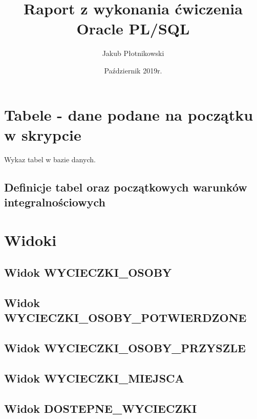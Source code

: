 \documentclass[a4paper, 11pt]{article}
\title{Raport z wykonania ćwiczenia Oracle PL/SQL}
\author{Jakub Płotnikowski}
\date{Październik 2019r.}
\begin{document}
    \maketitle
    \tableofcontents


    \newpage

    \section{Tabele - dane podane na początku w skrypcie}
    \begin{flushleft}
        Wykaz tabel w bazie danych.
    \end{flushleft}

    \subsection{Definicje tabel oraz początkowych warunków integralnościowych}
    

    \newpage

    \section{Widoki}

    \subsection{Widok WYCIECZKI\_OSOBY}
    

    \subsection{Widok WYCIECZKI\_OSOBY\_POTWIERDZONE}
    

    \subsection{Widok WYCIECZKI\_OSOBY\_PRZYSZLE}
    

    \newpage

    \subsection{Widok WYCIECZKI\_MIEJSCA}
    

    \subsection{Widok DOSTEPNE\_WYCIECZKI}
    
\end{document}
